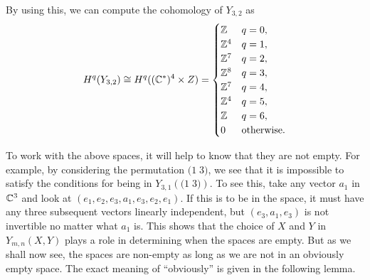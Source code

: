 \begin{example}
  By using this, we can compute the cohomology of $Y_{3,2}$ as
  \[ H^q(Y_{3,2}) \cong H^q((\mathbb{C}^*)^4\times Z) = 
  \begin{cases}
    \mathbb{Z} & q = 0, \\
    \mathbb{Z}^4 & q = 1, \\
    \mathbb{Z}^7 & q = 2, \\
    \mathbb{Z}^8 & q = 3, \\
    \mathbb{Z}^7 & q = 4, \\
    \mathbb{Z}^4 & q = 5, \\
    \mathbb{Z} & q = 6, \\
    0 & \text{otherwise}.
  \end{cases} \]
\end{example}



To work with the above spaces, it will help to know that they are not
empty. For example, by considering the permutation $\big(1\; 3\big)$,
we see that it is impossible to satisfy the 
conditions for being in $Y_{3,1}\left(\big(1\; 3\big)\right)$. To see
this, take any vector $a_1$ in $\mathbb{C}^3$ and look at
$(e_1,e_2,e_3,a_1,e_3,e_2,e_1)$. If this is to be in the space, it
must have any three subsequent vectors linearly independent, but
$(e_3,a_1,e_3)$ is not invertible no matter what $a_1$ is. This shows
that the choice of $X$ and $Y$ in $Y_{m,n}(X,Y)$ plays a role in
determining when the spaces are empty. But as we shall now see, the
spaces are non-empty as long as we are not in an obviously empty
space. The exact meaning of ``obviously'' is given in the following
lemma.

